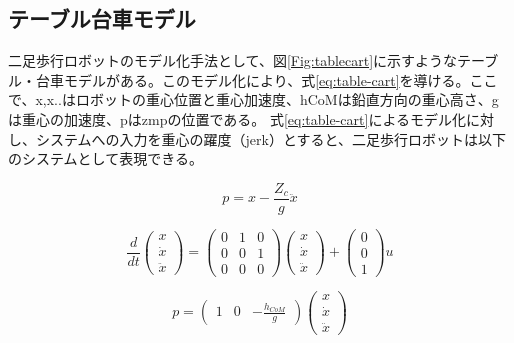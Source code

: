 \subsection{テーブル台車モデル}
二足歩行ロボットのモデル化手法として、図\ref{Fig:tablecart}に示すようなテーブル・台車モデルがある。このモデル化により、式\eqref{eq:table-cart}を導ける。ここで、x,x..はロボットの重心位置と重心加速度、hCoMは鉛直方向の重心高さ、gは重心の加速度、pはzmpの位置である。
式\eqref{eq:table-cart}によるモデル化に対し、システムへの入力を重心の躍度（jerk）とすると、二足歩行ロボットは以下のシステムとして表現できる。

\begin{equation}
  p = x - \frac{Z_{c}}{g}\ddot{x}
  \label{eq:table-cart}
\end{equation}


\begin{equation}
  \frac{d}{dt}\begin{pmatrix}
    x \\ \dot{x} \\ \ddot{x}
  \end{pmatrix}
  =
  \begin{pmatrix}
    0 & 1 & 0 \\ 0 & 0 & 1 \\ 0 & 0 & 0
  \end{pmatrix}
  \begin{pmatrix}
    x \\ \dot{x} \\ \ddot{x}
  \end{pmatrix}
  +
  \begin{pmatrix}
    0 \\ 0 \\ 1
  \end{pmatrix}
  u
  \label{eq:teble-cart-system-state}
\end{equation}

\begin{equation}
  p = \begin{pmatrix}
    1 & 0 & -\frac{h_{CoM}}{g}
  \end{pmatrix}
  \begin{pmatrix}
    x \\ \dot{x} \\ \ddot{x}
  \end{pmatrix}
  \label{eq:teble-cart-system-output}
\end{equation}


